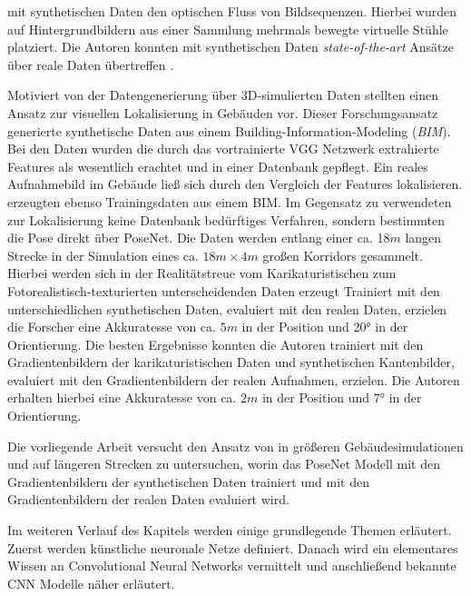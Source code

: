 mit synthetischen Daten den optischen Fluss von Bildsequenzen. Hierbei wurden auf Hintergrundbildern aus einer Sammlung mehrmals bewegte virtuelle Stühle platziert. Die Autoren konnten mit synthetischen Daten \textit{state-of-the-art} Ansätze über reale Daten übertreffen \cite{dosovitskiyFlowNetLearningOptical2015}.

Motiviert von der Datengenerierung über 3D-simulierten Daten stellten \citet{haImagebasedIndoorLocalization2018} einen Ansatz zur visuellen Lokalisierung in Gebäuden vor. Dieser Forschungsansatz generierte synthetische Daten aus einem Building-Information-Modeling (\textit{BIM}). Bei den Daten wurden die durch das vortrainierte VGG Netzwerk \cite{simonyanVeryDeepConvolutional2014} extrahierte Features als wesentlich erachtet und in einer Datenbank gepflegt. Ein reales Aufnahmebild im Gebäude ließ sich durch den Vergleich der Features lokalisieren. \citet{acharyaBIMPoseNetIndoorCamera2019} erzeugten ebenso Trainingsdaten aus einem BIM. Im Gegensatz zu \citet{haImagebasedIndoorLocalization2018} verwendeten \citet{acharyaBIMPoseNetIndoorCamera2019} zur Lokalisierung keine Datenbank bedürftiges Verfahren, sondern bestimmten die Pose direkt über PoseNet. Die Daten werden entlang einer ca. 18$m$ langen Strecke in der Simulation eines ca. $18m \times 4m$ großen Korridors gesammelt. Hierbei werden sich in der Realitätstreue vom Karikaturistischen zum Fotorealistisch-texturierten unterscheidenden Daten erzeugt
Trainiert mit den unterschiedlichen synthetischen Daten, evaluiert mit den realen Daten, erzielen die Forscher eine Akkuratesse von ca. $5m$ in der Position und 20° in der Orientierung.
Die besten Ergebnisse konnten die Autoren trainiert mit den Gradientenbildern der karikaturistischen Daten und synthetischen Kantenbilder, evaluiert mit den Gradientenbildern der realen Aufnahmen, erzielen. Die Autoren erhalten hierbei eine Akkuratesse von ca. $2m$ in der Position und 7° in der Orientierung.

Die vorliegende Arbeit versucht den Ansatz von \citet{acharyaBIMPoseNetIndoorCamera2019} in größeren Gebäudesimulationen und auf längeren Strecken  zu untersuchen, worin das PoseNet Modell mit den Gradientenbildern der synthetischen Daten trainiert und mit den Gradientenbildern der realen Daten evaluiert wird.

Im weiteren Verlauf des Kapitels werden einige grundlegende Themen erläutert. Zuerst werden künstliche neuronale Netze definiert. Danach wird ein elementares Wissen an Convolutional Neural Networks vermittelt und anschließend bekannte CNN Modelle näher erläutert.

